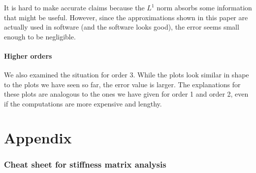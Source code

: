 \documentclass{article}
\begin{document}
It is hard to make accurate claims because the $L^1$ norm absorbs some information that might be useful. However, since the approximations shown in this paper are actually used in software (and the software looks good), the error seems small enough to be negligible.

\subsection{Higher orders}
\label{sec:stiffness-analysis-conclusion-higher-order}

We also examined the situation for order 3. While the plots look similar in shape to the plots we have seen so far, the error value is larger. The explanations for these plots are analogous to the ones we have given for order 1 and order 2, even if the computations are more expensive and lengthy.

\clearpage




\appendix

\clearpage{}
\part{Appendix}
\label{part:cheat-sheet}

\section{Cheat sheet for stiffness matrix analysis}
\label{sec:cheat-sheet-stiffn}

\newenvironment{meine}{}{}
\newcommand{\mypmatrix}[1]
{
  \begin{meine}
    \renewcommand{\arraystretch}{1}
    \begin{pmatrix}
      #1
    \end{pmatrix}
    \renewcommand{\arraystretch}{2}
  \end{meine}
}
\end{document}
